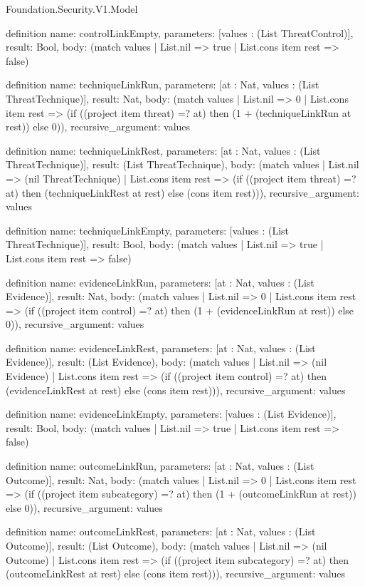 \begin{lexlean}{Foundation.Security.V1.Model}
\begin{semanticmodule}
definition{
  name: controlLinkEmpty,
  parameters: [values : (List ThreatControl)],
  result: Bool,
  body: (match values | List.nil => true | List.cons item rest => false)
}

definition{
  name: techniqueLinkRun,
  parameters: [at : Nat, values : (List ThreatTechnique)],
  result: Nat,
  body: (match values
    | List.nil => 0
    | List.cons item rest => (if ((project item threat) =? at) then (1 + (techniqueLinkRun at rest)) else 0)),
  recursive_argument: values
}

definition{
  name: techniqueLinkRest,
  parameters: [at : Nat, values : (List ThreatTechnique)],
  result: (List ThreatTechnique),
  body: (match values
    | List.nil => (nil ThreatTechnique)
    | List.cons item rest => (if ((project item threat) =? at) then (techniqueLinkRest at rest) else (cons item rest))),
  recursive_argument: values
}

definition{
  name: techniqueLinkEmpty,
  parameters: [values : (List ThreatTechnique)],
  result: Bool,
  body: (match values | List.nil => true | List.cons item rest => false)
}

definition{
  name: evidenceLinkRun,
  parameters: [at : Nat, values : (List Evidence)],
  result: Nat,
  body: (match values
    | List.nil => 0
    | List.cons item rest => (if ((project item control) =? at) then (1 + (evidenceLinkRun at rest)) else 0)),
  recursive_argument: values
}

definition{
  name: evidenceLinkRest,
  parameters: [at : Nat, values : (List Evidence)],
  result: (List Evidence),
  body: (match values
    | List.nil => (nil Evidence)
    | List.cons item rest => (if ((project item control) =? at) then (evidenceLinkRest at rest) else (cons item rest))),
  recursive_argument: values
}

definition{
  name: evidenceLinkEmpty,
  parameters: [values : (List Evidence)],
  result: Bool,
  body: (match values | List.nil => true | List.cons item rest => false)
}

definition{
  name: outcomeLinkRun,
  parameters: [at : Nat, values : (List Outcome)],
  result: Nat,
  body: (match values
    | List.nil => 0
    | List.cons item rest => (if ((project item subcategory) =? at) then (1 + (outcomeLinkRun at rest)) else 0)),
  recursive_argument: values
}

definition{
  name: outcomeLinkRest,
  parameters: [at : Nat, values : (List Outcome)],
  result: (List Outcome),
  body: (match values
    | List.nil => (nil Outcome)
    | List.cons item rest => (if ((project item subcategory) =? at) then (outcomeLinkRest at rest) else (cons item rest))),
  recursive_argument: values
}


\end{semanticmodule}
\end{lexlean}
